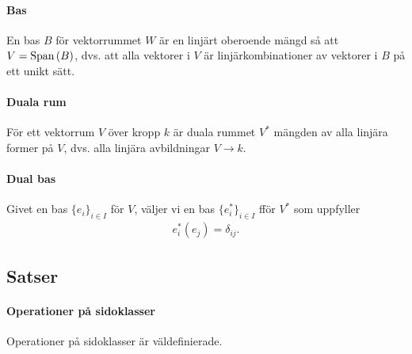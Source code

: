 \paragraph{Bas}
En bas $B$ för vektorrummet $W$ är en linjärt oberoende mängd så att $V = \text{Span}\left(B\right)$, dvs. att alla vektorer i $V$ är linjärkombinationer av vektorer i $B$ på ett unikt sätt.

\paragraph{Duala rum}
För ett vektorrum $V$ över kropp $k$ är duala rummet $V^{*}$ mängden av alla linjära former på $V$, dvs. alla linjära avbildningar $V\to k$.

\paragraph{Dual bas}
Givet en bas $\{e_{i}\}_{i\in I}$ för $V$, väljer vi en bas $\{e_{i}^{*}\}_{i\in I}$ fför $V^{*}$ som uppfyller
\begin{align*}
	e_{i}^{*}(e_{j}) = \delta_{ij}.
\end{align*}

\subsection{Satser}

\paragraph{Operationer på sidoklasser}
Operationer på sidoklasser är väldefinierade.

\proof
